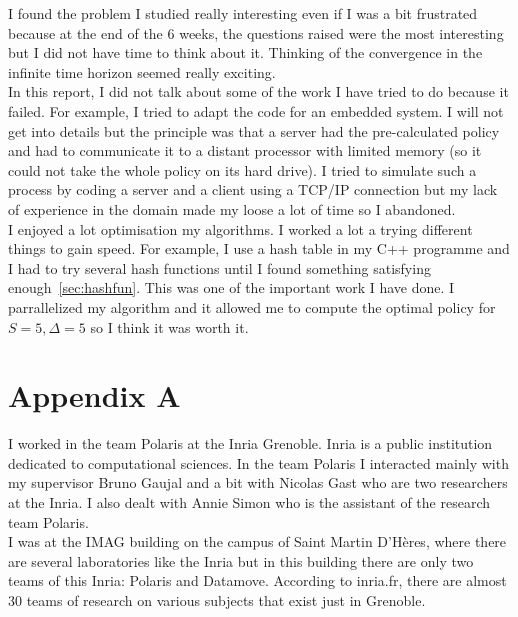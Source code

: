 \documentclass[
10pt, %
a4paper, %
oneside, %
headinclude,footinclude, %
BCOR5mm, %
]{scrartcl}
\begin{document}
I found the problem I studied really interesting even if I was a bit
frustrated because at the end of the 6 weeks, the questions raised
were the most interesting but I did not have time to think about
it. Thinking of the convergence in the infinite time horizon seemed
really exciting.\\

In this report, I did not talk about some of the work I have tried to
do because it failed. For example, I tried to adapt the code for an
embedded system. I will not get into details but the principle was that a
server had the pre-calculated policy and had to communicate it to a
distant processor with limited memory (so it could not take the whole
policy on its hard drive). I tried to simulate such a process by
coding a server and a client using a TCP/IP connection but my lack of
experience in the domain made my loose a lot of time so I
abandoned.\\

I enjoyed a lot optimisation my algorithms. I worked a lot a trying
different things to gain speed. For example, I use a hash table in my
C++ programme and I had to try several hash functions until I found
something satisfying enough~\ref{sec:hashfun}. This was one of the important work I have
done. I parrallelized my algorithm and it allowed me to compute the 
optimal policy for $S=5,\Delta=5$ so I think it was worth it.\\

\nocite{YaoDS95,Gaujal05}





\newpage

\section*{Appendix A}

I worked in the team Polaris at the Inria Grenoble. Inria is a public
institution dedicated to computational sciences. In the team Polaris I
interacted mainly with my supervisor Bruno Gaujal and a bit with
Nicolas Gast who are two researchers at the Inria. I also dealt with
Annie Simon who is the assistant of the research team Polaris.\\

I was at the IMAG building on the campus of Saint Martin D'Hères,
where there are several laboratories like the Inria but in this
building there are only two teams of this Inria: Polaris and
Datamove. According to inria.fr, there are almost 30 teams of research
on various subjects that exist just in Grenoble.\\
\end{document}
